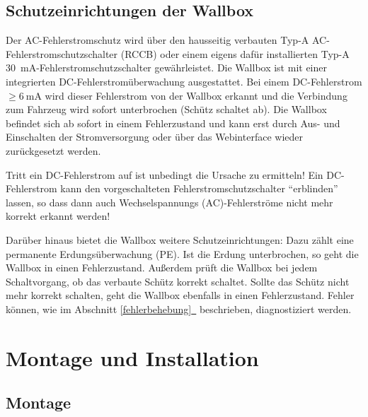 \documentclass[a4paper,10pt]{article}
\newcommand{\hint}[1]{\begin{tcolorbox}[colback=boxgray,colframe=black,coltext=
white,title=Hinweis,left*=2mm,right*=2mm,boxsep=1mm,bottom=1mm,top=1mm]#1\end{tcolorbox}}
\newcommand*{\fullref}[1]{Abschnitt \hyperref[{#1}]{\ref*{#1}~\nameref*{#1}}}
\begin{document}
\begin{multicols*}{2}
    \subsection{Schutzeinrichtungen der Wallbox}\label{dcerrorhint}
    Der AC-Fehlerstromschutz wird über den hausseitig verbauten
    Typ-A AC-Fehlerstromschutzschalter (RCCB) oder einem eigens dafür installierten
    Typ-A \SI{30}{\milli\ampere}-Fehlerstromschutzschalter gewährleistet. Die Wallbox ist
    mit einer integrierten DC-Fehlerstromüberwachung ausgestattet.
    Bei einem DC-Fehlerstrom $\geq \SI{6}{\milli\ampere}$ wird dieser
    Fehlerstrom von der Wallbox erkannt und die Verbindung zum Fahrzeug wird sofort
    unterbrochen (Schütz schaltet ab). Die Wallbox befindet sich ab sofort in einem
    Fehlerzustand und kann erst durch Aus- und Einschalten der
    Stromversorgung oder über das Webinterface wieder zurückgesetzt werden.
    \hint{Tritt ein DC-Fehlerstrom auf ist unbedingt die Ursache zu
    ermitteln! Ein DC-Fehlerstrom kann den vorgeschalteten Fehlerstromschutzschalter
    \enquote{erblinden} lassen, so dass dann auch Wechselspannungs
    (AC)-Fehlerströme nicht mehr korrekt erkannt werden!}

    Darüber hinaus bietet die Wallbox weitere Schutzeinrichtungen: Dazu zählt eine
    permanente Erdungsüberwachung (PE). Ist die Erdung unterbrochen, so geht die
    Wallbox in einen Fehlerzustand. Außerdem prüft die Wallbox bei jedem
    Schaltvorgang, ob das verbaute Schütz korrekt schaltet. Sollte das
    Schütz nicht mehr korrekt schalten, geht die Wallbox ebenfalls in einen Fehlerzustand.
    Fehler können, wie im \fullref{fehlerbehebung} beschrieben, diagnostiziert werden.

    \newpage
    \section{Montage und Installation}
    \subsection{Montage}

\end{multicols*}
\end{document}
